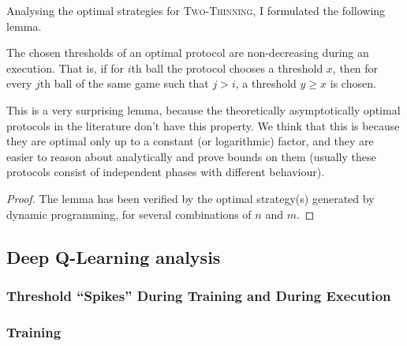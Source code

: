 Analysing the optimal strategies for \textsc{Two-Thinning}, I formulated the following lemma.

\begin{lemma}\label{lemma: two-thinning-increasing-threshold}
The chosen thresholds of an optimal protocol are non-decreasing during an execution. That is, if for $i$th ball the protocol chooses a threshold $x$, then for every $j$th ball of the same game such that $j>i$, a threshold $y\geq x$ is chosen.
\end{lemma}




This is a very surprising lemma, because the theoretically asymptotically optimal protocols in the literature don't have this property. We think that this is because they are optimal only up to a constant (or logarithmic) factor, and they are easier to reason about analytically and prove bounds on them (usually these protocols consist of independent phases with different behaviour).


\begin{proof}


The lemma has been verified by the optimal strategy(s) generated by dynamic programming, for several combinations of $n$ and $m$. 
\end{proof}




\subsection{Deep Q-Learning analysis}



\subsubsection{Threshold ``Spikes'' During Training and During Execution}



\subsubsection{Training}


